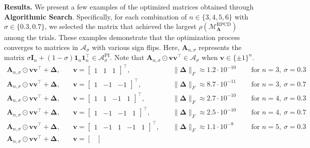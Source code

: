 \documentclass{article}
\theoremstyle{plain}
\theoremstyle{definition}
\theoremstyle{remark}
\newcommand{\RPCD}{\text{RPCD}} %
\newcommand{\MARPCD}{\mathcal{M}_{\bm{A}}^{\RPCD}} %
\def\vone{{\bm{1}}}
\def\vv{{\bm{v}}}
\def\mA{{\bm{A}}}
\def\mI{{\bm{I}}}
\begin{document}
\textbf{Results.}
We present a few examples of the optimized matrices obtained through \textbf{Algorithmic Search}. Specifically, for each combination of $n \in \{3, 4, 5, 6\}$ with $\sigma \in \{0.3, 0.7\}$, we selected the matrix that achieved the largest $\rho(\MARPCD)$ among the trials. These examples demonstrate that the optimization process converges to matrices in $\mathcal{A}_{\sigma}$ with various sign flips.
Here, $\mA_{n, \sigma}$ represents the matrix $\sigma \mI_n + (1-\sigma) \vone _n\vone_n^{\top} \in \mathcal{A}_{\sigma}^{\text{PI}}$. Note that $\mA_{n, \sigma} \odot \vv \vv^{\top} \in \mathcal{A}_{\sigma}$ when $\vv \in \{\pm 1\}^n$.
\begin{align*}
    \mA_{n, \sigma}\odot \vv \vv^{\top} + \mathbf{\Delta}, &\quad \vv=\begin{bmatrix}
        1 & 1 & 1
    \end{bmatrix}^{\top}, &\quad \| \mathbf{\Delta} \|_F \approx 1.2\cdot 10^{-10} &\quad \text { for } n=3,~\sigma=0.3 \\ 
    \mA_{n, \sigma}\odot \vv \vv^{\top} + \mathbf{\Delta}, &\quad \vv=\begin{bmatrix}
        1 & -1 & -1
    \end{bmatrix}^{\top}, &\quad \| \mathbf{\Delta} \|_F \approx 8.7\cdot 10^{-11} &\quad \text { for } n=3,~\sigma=0.7 \\ 
    \mA_{n, \sigma}\odot \vv \vv^{\top} + \mathbf{\Delta}, &\quad \vv=\begin{bmatrix}
        1 & 1 & -1 & 1
    \end{bmatrix}^{\top}, &\quad \| \mathbf{\Delta} \|_F \approx 2.7\cdot 10^{-10} &\quad \text { for } n=4,~\sigma=0.3 \\ 
    \mA_{n, \sigma}\odot \vv \vv^{\top} + \mathbf{\Delta}, &\quad \vv=\begin{bmatrix}
        1 & -1 & -1 & 1
    \end{bmatrix}^{\top}, &\quad \| \mathbf{\Delta} \|_F \approx 2.5\cdot 10^{-10} &\quad \text { for } n=4,~\sigma=0.7 \\ 
    \mA_{n, \sigma}\odot \vv \vv^{\top} + \mathbf{\Delta}, &\quad \vv=\begin{bmatrix}
        1 & -1 & 1 & -1 & 1
    \end{bmatrix}^{\top}, &\quad \| \mathbf{\Delta} \|_F \approx 1.1\cdot 10^{-8} &\quad \text { for } n=5,~\sigma=0.3 \\ 
    \mA_{n, \sigma}\odot \vv \vv^{\top} + \mathbf{\Delta}, &\quad \vv=\begin{bmatrix}

\end{bmatrix}
\end{align*}
\end{document}
